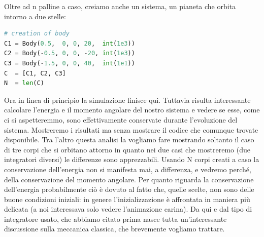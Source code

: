 \documentclass[10pt,a4paper]{article}
\begin{document}
Oltre ad n palline a caso, creiamo anche un sistema, un pianeta che orbita intorno a due stelle:
\begin{lstlisting}[language=Python]
# creation of body
C1 = Body(0.5,  0, 0, 20,  int(1e3))
C2 = Body(-0.5, 0, 0, -20, int(1e3))
C3 = Body(-1.5, 0, 0, 40,  int(1e1))
C  = [C1, C2, C3]
N  = len(C)
\end{lstlisting}
Ora in linea di principio la simulazione finisce qui. Tuttavia risulta interessante calcolare l'energia e il momento angolare del nostro sistema e vedere se esse, come ci si aspetteremmo, sono effettivamente conservate durante l'evoluzione del sistema. Mostreremo i risultati ma senza mostrare il codice che comunque trovate disponibile. Tra l'altro questa analisi la vogliamo fare mostrando soltanto il caso di tre corpi che si orbitano attorno in quanto nei due casi che mostreremo (due integratori diversi) le differenze sono apprezzabili. Usando N corpi creati a caso la conservazione dell'energia non si manifesta mai, a differenza, e vedremo perché, della conservazione del momento angolare. Per quanto riguarda la conservazione dell'energia probabilmente ciò è dovuto al fatto che, quelle scelte, non sono delle buone condizioni iniziali: in genere l'inizializzazione è affrontata in maniera più delicata (a noi interessava solo vedere l'animazione carina).
Da qui e dal tipo di integratore usato, che abbiamo citato prima nasce tutta un'interessante discussione sulla meccanica classica, che brevemente vogliamo trattare.
\end{document}

